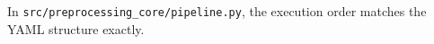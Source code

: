 \begin{frame}

  \vspace{14mm}
  {\small In \verb|src/preprocessing_core/pipeline.py|, the execution order matches the YAML structure exactly.}\par
  \vspace{1mm}

  

  \slideheaderfooter
\end{frame}
